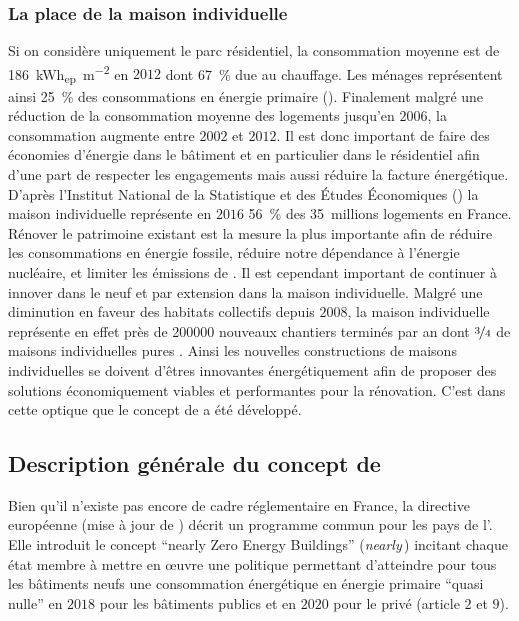 \subsubsection{La place de la maison individuelle} %
\label{ssub:la_place_de_la_maison_individuelle}
Si on considère uniquement le parc résidentiel, la consommation moyenne
est de \SI{186}{\kWh_{ep}\per\metre\squared} en $2012$ dont \SI{67}{\percent} due
au chauffage. Les ménages représentent ainsi \SI{25}{\percent} des consommations
en énergie primaire (). Finalement malgré
une réduction de la consommation moyenne des logements jusqu’en $2006$, la
consommation augmente entre $2002$ et $2012$. Il est donc important
de faire des économies d’énergie dans le bâtiment et en particulier dans le résidentiel
afin d’une part de respecter les engagements mais aussi réduire la facture énergétique.
D’après l’Institut National de la Statistique et des Études Économiques ()
la maison individuelle représente en $2016$ \SI{56}{\percent} des \SI{35}{millions}
logements en France.
Rénover le patrimoine existant est la mesure la plus importante afin de réduire
les consommations en énergie fossile, réduire notre dépendance à l’énergie nucléaire,
et limiter les émissions de . Il est cependant important de continuer à
innover dans le neuf et par extension dans la maison individuelle.
Malgré une diminution en faveur des habitats collectifs depuis $2008$, la maison individuelle
représente en effet près de \num{200000} nouveaux chantiers terminés par an dont $\nicefrac{3}{4}$
de maisons individuelles pures \parencite{Caicedo2015}.
Ainsi les nouvelles constructions de maisons individuelles se doivent d’êtres innovantes
énergétiquement afin de proposer des solutions économiquement viables et performantes
pour la rénovation. C’est dans cette optique que le concept de  a été
développé.



\subsection{Description générale du concept de } %
\label{sub:description_generale_du_concept_de_bepos}
Bien qu’il n’existe pas encore de cadre réglementaire en France,
la directive européenne  \parencite{EPBD2010} (mise à jour de \textcite{EPBD2002})
décrit un programme commun pour les pays de l’.
Elle introduit le concept \enquote{nearly Zero Energy Buildings}
(\textit{nearly}\,) incitant chaque état membre à mettre en
œuvre une politique permettant d’atteindre pour tous les bâtiments neufs une consommation
énergétique en énergie primaire \enquote{quasi nulle} en $2018$ pour les bâtiments publics
et en $2020$ pour le privé (article $2$ et $9$).

